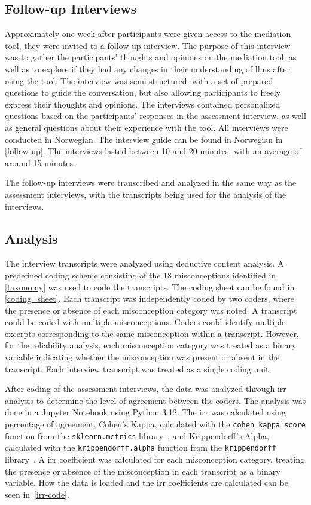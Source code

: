 \subsection{Follow-up Interviews}
Approximately one week after participants were given access to the mediation tool, they were invited to a follow-up interview. The purpose of this interview was to gather the participants' thoughts and opinions on the mediation tool, as well as to explore if they had any changes in their understanding of \gls{llms} after using the tool. The interview was semi-structured, with a set of prepared questions to guide the conversation, but also allowing participants to freely express their thoughts and opinions. The interviews contained personalized questions based on the participants' responses in the assessment interview, as well as general questions about their experience with the tool. All interviews were conducted in Norwegian. The interview guide can be found in Norwegian in \autoref{follow-up}. The interviews lasted between 10 and 20 minutes, with an average of around 15 minutes.

The follow-up interviews were transcribed and analyzed in the same way as the assessment interviews, with the transcripts being used for the analysis of the interviews.

\subsection{Analysis}
The interview transcripts were analyzed using deductive content analysis. A predefined coding scheme consisting of the 18 misconceptions identified in \autoref{taxonomy} was used to code the transcripts. The coding sheet can be found in \autoref{coding_sheet}. Each transcript was independently coded by two coders, where the presence or absence of each misconception category was noted. A transcript could be coded with multiple misconceptions. Coders could identify multiple excerpts corresponding
to the same misconception within a transcript. However, for the reliability analysis, each misconception category was treated as a binary variable indicating whether the misconception was present or absent in the transcript. Each interview transcript was treated as a single coding unit.

After coding of the assessment interviews, the data was analyzed through \gls{irr} analysis to determine the level of agreement between the coders. The analysis was done in a Jupyter Notebook using Python 3.12. The \gls{irr} was calculated using percentage of agreement, Cohen's Kappa, calculated with the \texttt{cohen\_kappa\_score} function from the \texttt{sklearn.metrics} library~\cite{scikit-learn}, and Krippendorff's Alpha, calculated with the \texttt{krippendorff.alpha} function from the \texttt{krippendorff} library~\cite{castro-2017-fast-krippendorff}. A \gls{irr} coefficient was calculated for each misconception category, treating the presence or absence of the misconception in each transcript as a binary variable. How the data is loaded and the \gls{irr} coefficients are calculated can be seen in~\autoref{irr-code}. 

